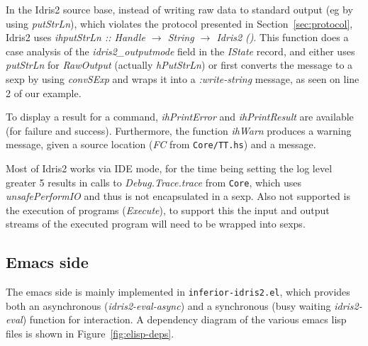 \documentclass{article}
\begin{document}
In the Idris2 source base, instead of writing raw data to standard output (eg by using \emph{putStrLn}), which violates the protocol presented in Section~\ref{sec:protocol}, Idris2 uses \emph{ihputStrLn :: Handle $\rightarrow$ String $\rightarrow$ Idris2 ()}.
This function does a case analysis of the \emph{idris2\_outputmode} field in the \emph{IState} record, and either uses \emph{putStrLn} for \emph{RawOutput} (actually \emph{hPutStrLn}) or first converts the message to a sexp by using \emph{convSExp} and wraps it into a \emph{:write-string} message, as seen on line 2 of our example.

To display a result for a command, \emph{ihPrintError} and \emph{ihPrintResult} are available (for failure and success).
Furthermore, the function \emph{ihWarn} produces a warning message, given a source location (\emph{FC} from \texttt{Core/TT.hs}) and a message.

Most of Idris2 works via IDE mode, for the time being setting the log level greater 5 results in calls to \emph{Debug.Trace.trace} from \texttt{Core}, which uses \emph{unsafePerformIO} and thus is not encapsulated in a sexp.
Also not supported is the execution of programs (\emph{Execute}), to support this the input and output streams of the executed program will need to be wrapped into sexps.

\subsection{Emacs side}
The emacs side is mainly implemented in \texttt{inferior-idris2.el}, which provides both an asynchronous (\emph{idris2-eval-async}) and a synchronous (busy waiting \emph{idris2-eval}) function for interaction.
A dependency diagram of the various emacs lisp files is shown in Figure~\ref{fig:elisp-deps}.
\end{document}
